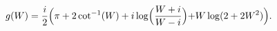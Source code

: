 \begin{equation}
  g(W)  =\frac{i}{2} \Bigl( \pi+2 \cot^{-1} (W) 
   + i \log \Bigl( \frac{W+i}{W-i}\Bigl) + W \log(2+2 W^2) \Bigl).
\end{equation}

